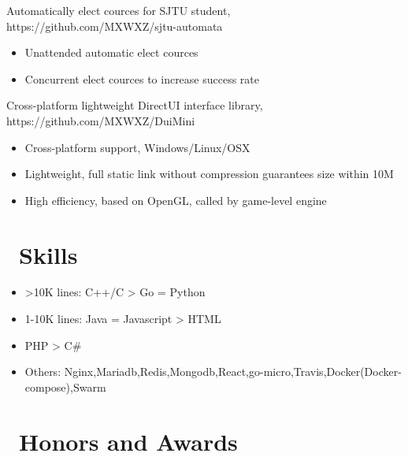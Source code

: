 \documentclass{resume}
\begin{document}
Automatically elect cources for SJTU student, https://github.com/MXWXZ/sjtu-automata
\begin{itemize}
    \item Unattended automatic elect cources
    \item Concurrent elect cources to increase success rate
\end{itemize}

Cross-platform lightweight DirectUI interface library, https://github.com/MXWXZ/DuiMini
\begin{itemize}
    \item Cross-platform support, Windows/Linux/OSX
    \item Lightweight, full static link without compression guarantees size within 10M
    \item High efficiency, based on OpenGL, called by game-level engine
\end{itemize}


\section{\faCogs\ Skills}
\begin{itemize}[parsep=0.5ex]
    \item >10K lines: C++/C > Go = Python
    \item 1-10K lines: Java = Javascript > HTML
    \item <1K lines: Shell > PHP > C\#
    \item Others: Nginx,Mariadb,Redis,Mongodb,React,go-micro,Travis,Docker(Docker-compose),Swarm
\end{itemize}

\section{\faHeartO\ Honors and Awards}
\end{document}

